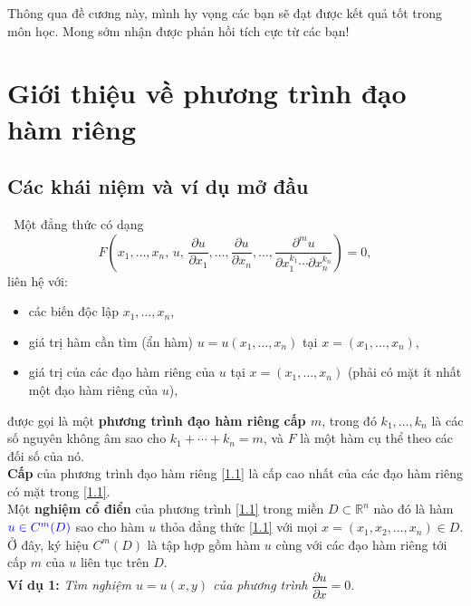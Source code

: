 \documentclass[10pt, a4paper]{article}
\begin{document}
	Thông qua đề cương này, mình hy vọng các bạn sẽ đạt được kết quả tốt trong môn học. Mong sớm nhận được phản hồi tích cực từ các bạn!\\
	
	\newpage
	\tableofcontents
	\newpage
	\section{Giới thiệu về phương trình đạo hàm riêng}
	\subsection{Các khái niệm và ví dụ mở đầu}
	\quad\,\,\,Một đẳng thức có dạng \begin{equation} \tag{1.1} \label{1.1}
		F\left(x_1,\ldots,x_n,\,u,\,\frac{\partial u}{\partial x_1},\ldots,\frac{\partial u}{\partial x_n},\ldots,\frac{\partial^mu}{\partial x_1^{k_1}\cdots\partial x_n^{k_n}}\right)=0,
	\end{equation}
	liên hệ với: \begin{itemize}
		\item các biến độc lập $x_1,\ldots,x_n$,
		\item giá trị hàm cần tìm (ẩn hàm) $u=u(x_1,\ldots,x_n)$ tại $x=(x_1,\ldots,x_n)$,
		\item giá trị của các đạo hàm riêng của $u$ tại $x=(x_1,\ldots,x_n)$ (phải có mặt ít nhất một đạo hàm riêng của $u$),
	\end{itemize}
	được gọi là một \textbf{\color{red}phương trình đạo hàm riêng cấp $m$}, trong đó $k_1,\ldots,k_n$ là các số nguyên không âm sao cho $k_1+\cdots+k_n=m$, và $F$ là một hàm cụ thể theo các đối số của nó.\\
	
	\textbf{\color{red}Cấp} của phương trình đạo hàm riêng \eqref{1.1} là cấp cao nhất của các đạo hàm riêng có mặt trong \eqref{1.1}.\\
	
	Một \textbf{\color{red}nghiệm cổ điển} của phương trình \eqref{1.1} trong miền $D\subset\mathbb R^n$ nào đó là hàm $\color{blue}u\in C^m(D)$ sao cho hàm $u$ thỏa đẳng thức \eqref{1.1} với mọi $x=(x_1,x_2,\ldots,x_n)\in D$. Ở đây, ký hiệu $C^m(D)$ là tập hợp gồm hàm $u$ cùng với các đạo hàm riêng tới cấp $m$ của $u$ liên tục trên $D$.\\
	
	\textbf{Ví dụ 1:} \textit{Tìm nghiệm $u=u(x,y)$ của phương trình} $\dfrac{\partial u}{\partial x}=0$.\\
	
\end{document}
